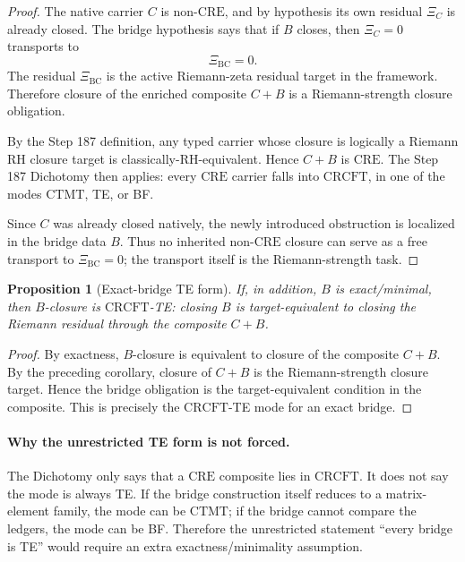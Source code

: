 \documentclass[11pt]{article}
\newtheorem{proposition}{Proposition}
\newcommand{\XiBC}{\Xi_{\mathrm{BC}}}
\newcommand{\XiC}{\Xi_C}
\newcommand{\CRE}{\mathrm{CRE}}
\newcommand{\CRCFT}{\mathrm{CRCFT}}
\newcommand{\CTMT}{\mathrm{CTMT}}
\begin{document}
\begin{proof}
The native carrier \(C\) is non-\(\CRE\), and by hypothesis its own residual
\(\XiC\) is already closed.  The bridge hypothesis says that if \(B\) closes,
then \(\XiC=0\) transports to
\[
\XiBC=0.
\]
The residual \(\XiBC\) is the active Riemann-zeta residual target in the
framework.  Therefore closure of the enriched composite \(C+B\) is a
Riemann-strength closure obligation.

By the Step 187 definition, any typed carrier whose closure is logically a
Riemann RH closure target is classically-RH-equivalent.  Hence \(C+B\) is
\(\CRE\).  The Step 187 Dichotomy then applies: every \(\CRE\) carrier falls
into \(\CRCFT\), in one of the modes \(\CTMT\), TE, or BF.

Since \(C\) was already closed natively, the newly introduced obstruction is
localized in the bridge data \(B\).  Thus no inherited non-\(\CRE\) closure can
serve as a free transport to \(\XiBC=0\); the transport itself is the
Riemann-strength task.
\end{proof}

\begin{proposition}[Exact-bridge TE form]
If, in addition, \(B\) is exact/minimal, then \(B\)-closure is
\(\CRCFT\)-TE: closing \(B\) is target-equivalent to closing the Riemann
residual through the composite \(C+B\).
\end{proposition}

\begin{proof}
By exactness, \(B\)-closure is equivalent to closure of the composite
\(C+B\).  By the preceding corollary, closure of \(C+B\) is the
Riemann-strength closure target.  Hence the bridge obligation is the
target-equivalent condition in the composite.  This is precisely the
\(\CRCFT\)-TE mode for an exact bridge.
\end{proof}

\paragraph{Why the unrestricted TE form is not forced.}
The Dichotomy only says that a \(\CRE\) composite lies in \(\CRCFT\).  It does
not say the mode is always TE.  If the bridge construction itself reduces to a
matrix-element family, the mode can be \(\CTMT\); if the bridge cannot compare
the ledgers, the mode can be BF.  Therefore the unrestricted statement
``every bridge is TE'' would require an extra exactness/minimality assumption.
\end{document}

